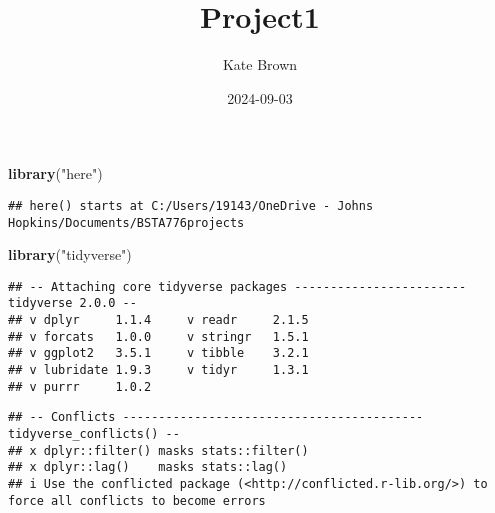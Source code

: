 \documentclass[
]{article}
\title{Project1}
\author{Kate Brown}
\date{2024-09-03}
\newenvironment{Shaded}{\begin{snugshade}}{\end{snugshade}}
\newcommand{\FunctionTok}[1]{\textcolor[rgb]{0.13,0.29,0.53}{\textbf{#1}}}
\newcommand{\NormalTok}[1]{#1}
\newcommand{\StringTok}[1]{\textcolor[rgb]{0.31,0.60,0.02}{#1}}
\begin{document}
\maketitle

\begin{Shaded}
\begin{Highlighting}[]
\FunctionTok{library}\NormalTok{(}\StringTok{"here"}\NormalTok{)}
\end{Highlighting}
\end{Shaded}

\begin{verbatim}
## here() starts at C:/Users/19143/OneDrive - Johns Hopkins/Documents/BSTA776projects
\end{verbatim}

\begin{Shaded}
\begin{Highlighting}[]
\FunctionTok{library}\NormalTok{(}\StringTok{"tidyverse"}\NormalTok{)}
\end{Highlighting}
\end{Shaded}

\begin{verbatim}
## -- Attaching core tidyverse packages ------------------------ tidyverse 2.0.0 --
## v dplyr     1.1.4     v readr     2.1.5
## v forcats   1.0.0     v stringr   1.5.1
## v ggplot2   3.5.1     v tibble    3.2.1
## v lubridate 1.9.3     v tidyr     1.3.1
## v purrr     1.0.2
\end{verbatim}

\begin{verbatim}
## -- Conflicts ------------------------------------------ tidyverse_conflicts() --
## x dplyr::filter() masks stats::filter()
## x dplyr::lag()    masks stats::lag()
## i Use the conflicted package (<http://conflicted.r-lib.org/>) to force all conflicts to become errors
\end{verbatim}
\end{document}
